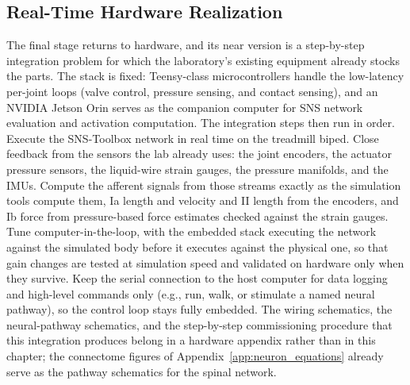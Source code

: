 \subsection{Real-Time Hardware Realization}\label{sec:fw_hardware}

The final stage returns to hardware, and its near version is a step-by-step integration problem for which the laboratory's existing equipment already stocks the parts. The stack is fixed: Teensy-class microcontrollers handle the low-latency per-joint loops (valve control, pressure sensing, and contact sensing), and an NVIDIA Jetson Orin serves as the companion computer for SNS network evaluation and activation computation. The integration steps then run in order. Execute the SNS-Toolbox network in real time on the treadmill biped. Close feedback from the sensors the lab already uses: the joint encoders, the actuator pressure sensors, the liquid-wire strain gauges, the pressure manifolds, and the IMUs. Compute the afferent signals from those streams exactly as the simulation tools compute them, Ia length and velocity and II length from the encoders, and Ib force from pressure-based force estimates checked against the strain gauges. Tune computer-in-the-loop, with the embedded stack executing the network against the simulated body before it executes against the physical one, so that gain changes are tested at simulation speed and validated on hardware only when they survive. Keep the serial connection to the host computer for data logging and high-level commands only (e.g., run, walk, or stimulate a named neural pathway), so the control loop stays fully embedded. The wiring schematics, the neural-pathway schematics, and the step-by-step commissioning procedure that this integration produces belong in a hardware appendix rather than in this chapter; the connectome figures of Appendix~\ref{app:neuron_equations} already serve as the pathway schematics for the spinal network.

